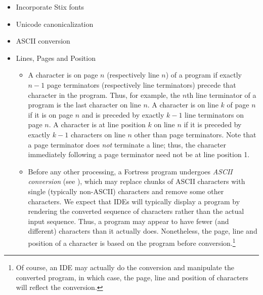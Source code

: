 \begin{itemize}
\item Incorporate Stix fonts

\item Unicode canonicalization

\item ASCII conversion

\item {} Lines, Pages and Position
  \begin{itemize}
  \item
A character is on page $n$
(respectively line $n$) of a program
if exactly $n-1$ page terminators (respectively line terminators)
precede that character in the program.
Thus, for example,
the $n$th line terminator of a program
is the last character on line $n$.
A character is on line $k$ of page $n$
if it is on page $n$
and is preceded by exactly $k-1$ line terminators on page $n$.
A character is at line position $k$ on line $n$
if it is preceded by exactly $k-1$ characters on line $n$
other than page terminators.
Note that a page terminator does \emph{not} terminate a line;
thus, the character immediately following a page terminator
need not be at line position 1.

  \item
Before any other processing,
a Fortress program undergoes \emph{ASCII conversion}
(see ),
which may replace chunks of ASCII characters
with single (typically non-ASCII) characters
and remove some other characters.
We expect that IDEs will typically display a program
by rendering the converted sequence of characters
rather than the actual input sequence.
Thus, a program may appear to have fewer (and different) characters
than it actually does.
Nonetheless,
the page, line and position of a character
is based on the program before conversion.\footnote{Of course,
an IDE may actually do the conversion
and manipulate the converted program,
in which case,
the page, line and position of characters will reflect the conversion.
}
  \end{itemize}


\end{itemize}
